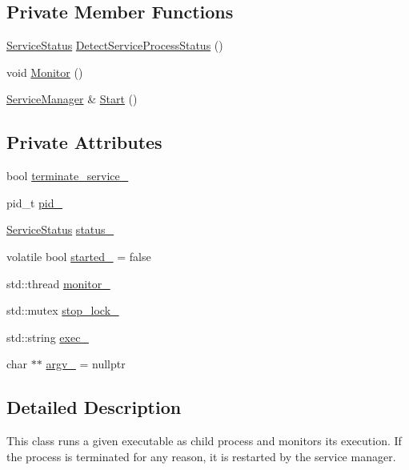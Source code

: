 \subsection*{Private Member Functions}
\begin{DoxyCompactItemize}
\item 
\hyperlink{classServiceManager_af3f2b1502eece536d0e4c8d3f2fa439d}{Service\+Status} \hyperlink{classServiceManager_abaa048208d3f357f320f89f108e5bada}{Detect\+Service\+Process\+Status} ()
\item 
void \hyperlink{classServiceManager_a88f70377d5303fe8ddf0c09a31f52685}{Monitor} ()
\item 
\hyperlink{classServiceManager}{Service\+Manager} \& \hyperlink{classServiceManager_a57a9b4739ef6da5f70bef63a6b878b41}{Start} ()
\end{DoxyCompactItemize}
\subsection*{Private Attributes}
\begin{DoxyCompactItemize}
\item 
bool \hyperlink{classServiceManager_a36d84d3bd84c63bed0bdf916ca76b9a8}{terminate\+\_\+service\+\_\+}
\item 
pid\+\_\+t \hyperlink{classServiceManager_ad2b098ca3fbac9d68c55440f705665f2}{pid\+\_\+}
\item 
\hyperlink{classServiceManager_af3f2b1502eece536d0e4c8d3f2fa439d}{Service\+Status} \hyperlink{classServiceManager_a42f26d759ac8c72acc67e1ac9ef442d3}{status\+\_\+}
\item 
volatile bool \hyperlink{classServiceManager_afce0c026b81fdfec606bac6ef07deb09}{started\+\_\+} = false
\item 
std\+::thread \hyperlink{classServiceManager_af0b991a29d3e0864506998db4cc03e21}{monitor\+\_\+}
\item 
std\+::mutex \hyperlink{classServiceManager_ad60510e962c31ea8b1d0867701d95582}{stop\+\_\+lock\+\_\+}
\item 
std\+::string \hyperlink{classServiceManager_afd71696bbf522fb6828c6145cf769db9}{exec\+\_\+}
\item 
char $\ast$$\ast$ \hyperlink{classServiceManager_a174f797da9bf2b3d81444ed1c743b7b2}{argv\+\_\+} = nullptr
\end{DoxyCompactItemize}


\subsection{Detailed Description}
This class runs a given executable as child process and monitors its execution. If the process is terminated for any reason, it is restarted by the service manager. 

